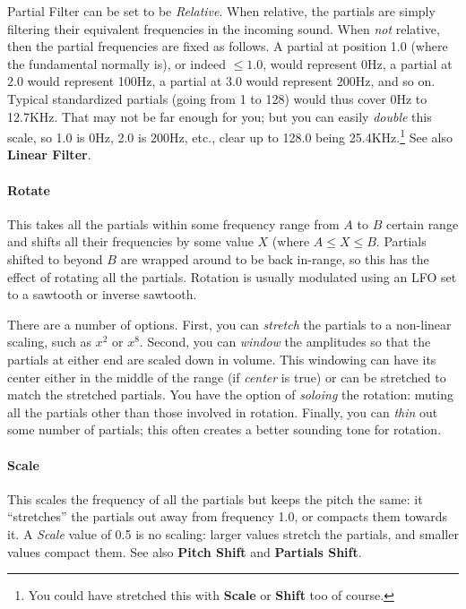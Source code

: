 \documentclass{article}
\begin{document}
Partial Filter can be set to be {\it Relative}.  When relative, the partials are simply filtering their equivalent frequencies in the incoming sound.  When {\it not} relative, then the partial frequencies are fixed as follows.  A partial at position 1.0 (where the fundamental normally is), or indeed \(\leq 1.0\), would represent 0Hz, a partial at 2.0 would represent 100Hz, a partial at 3.0 would represent 200Hz, and so on.  Typical standardized partials (going from 1 to 128) would thus cover 0Hz to 12.7KHz.  That may not be far enough for you; but you can easily {\it double} this scale, so 1.0 is 0Hz, 2.0 is 200Hz, etc., clear up to 128.0 being 25.4KHz.\footnote{You could have stretched this with {\bf Scale} or {\bf Shift} too of course.}  See also {\bf Linear Filter}.

\paragraph{Rotate}  This takes all the partials within some frequency range from \(A\) to \(B\) certain range and shifts all their frequencies by some value \(X\) (where \(A \leq X \leq B\).  Partials shifted to beyond \(B\) are wrapped around to be back in-range, so this has the effect of rotating all the partials.  Rotation is usually modulated using an LFO set to a sawtooth or inverse sawtooth.

There are a number of options.  First, you can {\it stretch} the partials to a non-linear scaling, such as \(x^2\) or \(x^8\).  Second, you can {\it window} the amplitudes so that the partials at either end are scaled down in volume.  This windowing can have its center either in the middle of the range (if {\it center} is true) or can be stretched to match the stretched partials.  You have the option of {\it soloing} the rotation: muting all the partials other than those involved in rotation.  Finally, you can {\it thin} out some number of partials; this often creates a better sounding tone for rotation.
 
\paragraph{Scale} This scales the frequency of all the partials but keeps the pitch the same: it ``stretches'' the partials out away from frequency 1.0, or compacts them towards it.  A {\it Scale} value of 0.5 is no scaling: larger values stretch the partials, and smaller values compact them.   See also  {\bf Pitch Shift} and  {\bf Partials Shift}.
\end{document}
